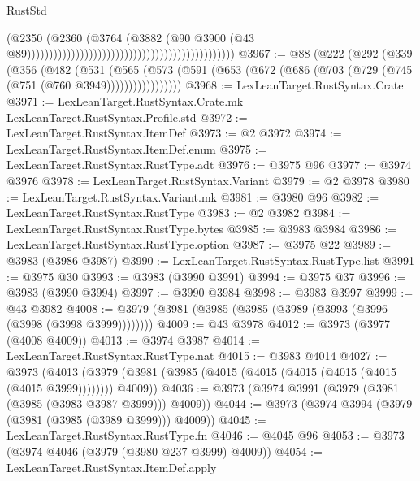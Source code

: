 \begin{lexlean}{RustStd}
\begin{coremodule}
{\begin{coremodule}
{{{{{{{{{{{{{{{{{{{{{{{{{{{{{{{{{{{{{{{{{{{{{{{{{{{{{{{{{{{{{{{{{{{{                                                                                      (@2350
                                                                                        (@2360
                                                                                          (@3764
                                                                                            (@3882
                                                                                              (@90
                                                                                                @3900
                                                                                                (@43
                                                                                                  @89)))))))))))))))))))))))))))))))))))))))))))))))
@3967 := @88
    (@222
      (@292
        (@339
          (@356
            (@482
              (@531
                (@565
                  (@573 (@591 (@653 (@672 (@686 (@703 (@729 (@745 (@751 (@760 @3949)))))))))))))))))
@3968 := LexLeanTarget.RustSyntax.Crate
@3971 := LexLeanTarget.RustSyntax.Crate.mk LexLeanTarget.RustSyntax.Profile.std
@3972 := LexLeanTarget.RustSyntax.ItemDef
@3973 := @2 @3972
@3974 := LexLeanTarget.RustSyntax.ItemDef.enum
@3975 := LexLeanTarget.RustSyntax.RustType.adt
@3976 := @3975 @96
@3977 := @3974 @3976
@3978 := LexLeanTarget.RustSyntax.Variant
@3979 := @2 @3978
@3980 := LexLeanTarget.RustSyntax.Variant.mk
@3981 := @3980 @96
@3982 := LexLeanTarget.RustSyntax.RustType
@3983 := @2 @3982
@3984 := LexLeanTarget.RustSyntax.RustType.bytes
@3985 := @3983 @3984
@3986 := LexLeanTarget.RustSyntax.RustType.option
@3987 := @3975 @22
@3989 := @3983 (@3986 @3987)
@3990 := LexLeanTarget.RustSyntax.RustType.list
@3991 := @3975 @30
@3993 := @3983 (@3990 @3991)
@3994 := @3975 @37
@3996 := @3983 (@3990 @3994)
@3997 := @3990 @3984
@3998 := @3983 @3997
@3999 := @43 @3982
@4008 := @3979 (@3981 (@3985 (@3985 (@3989 (@3993 (@3996 (@3998 (@3998 @3999))))))))
@4009 := @43 @3978
@4012 := @3973 (@3977 (@4008 @4009))
@4013 := @3974 @3987
@4014 := LexLeanTarget.RustSyntax.RustType.nat
@4015 := @3983 @4014
@4027 := @3973
    (@4013 (@3979 (@3981 (@3985 (@4015 (@4015 (@4015 (@4015 (@4015 (@4015 @3999)))))))) @4009))
@4036 := @3973 (@3974 @3991 (@3979 (@3981 (@3985 (@3983 @3987 @3999))) @4009))
@4044 := @3973 (@3974 @3994 (@3979 (@3981 (@3985 (@3989 @3999))) @4009))
@4045 := LexLeanTarget.RustSyntax.RustType.fn
@4046 := @4045 @96
@4053 := @3973 (@3974 @4046 (@3979 (@3980 @237 @3999) @4009))
@4054 := LexLeanTarget.RustSyntax.ItemDef.apply
}}}}}}}}}}}}}}}}}}}}}}}}}}}}}}}}}}}}}}}}}}}}}}}}}}}}}}}}}}}}}}}}}}}}
\end{coremodule}}
\end{coremodule}
\end{lexlean}
